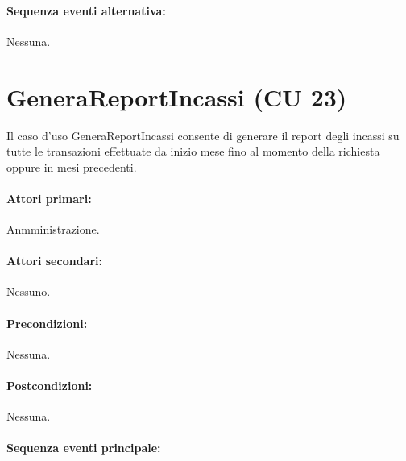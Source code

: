\documentclass{article}
\begin{document}
	\paragraph{Sequenza eventi alternativa:} Nessuna.

	
	
	
	
	
	
	
	
	
\pagebreak 
	
	\section*{GeneraReportIncassi (CU 23)}
	
	\indent\indent Il caso d’uso GeneraReportIncassi consente di generare il report degli incassi su tutte le transazioni effettuate da inizio mese fino al momento della richiesta oppure in mesi precedenti.
	
	\paragraph{Attori primari:}Anmministrazione.%
	
	\paragraph{Attori secondari:}Nessuno.
	
	\paragraph{Precondizioni:}Nessuna.
	
	\paragraph{Postcondizioni:}Nessuna.
	
	\paragraph{Sequenza eventi principale:}
\end{document}
